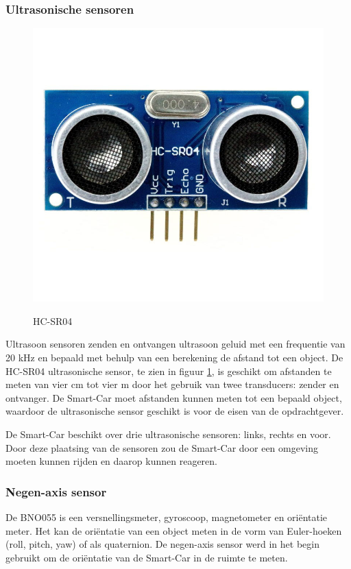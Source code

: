 \subsubsection{Ultrasonische sensoren}
\begin{figure}[h]
    \centering
    \includegraphics[scale = 0.2]{Media/Figuren/HCSR04-hardware.jpg}
    \caption{HC-SR04}
    \label{HC-SR04-component}
    \cite{HC-SR04-image-RL} 
\end{figure}
Ultrasoon sensoren zenden en ontvangen ultrasoon geluid met een frequentie van 20 kHz en bepaald met behulp van een berekening de afstand tot een object. De HC-SR04 ultrasonische sensor, te zien in figuur \ref{HC-SR04-component}\cite{HC-SR04-image-RL}, is geschikt om afstanden te meten van vier cm tot vier m door het gebruik van twee \gls{transducer}s: zender en ontvanger. De \gls{Smart-Car} moet afstanden kunnen meten tot een bepaald object, waardoor de ultrasonische sensor geschikt is voor de eisen van de opdrachtgever\cite{HC-SR04}.

De \gls{Smart-Car} beschikt over drie ultrasonische sensoren: links, rechts en voor. Door deze plaatsing van de sensoren zou de \gls{Smart-Car} door een omgeving moeten kunnen rijden en daarop kunnen reageren. 

\subsubsection{Negen-axis sensor}
De BNO055\cite{AXIS} is een versnellingsmeter, gyroscoop, magnetometer en oriëntatie meter. Het kan de oriëntatie van een object meten in de vorm van Euler-hoeken (roll, pitch, yaw) of als quaternion. De negen-axis sensor werd in het begin gebruikt om de oriëntatie van de \gls{Smart-Car} in de ruimte te meten. 

